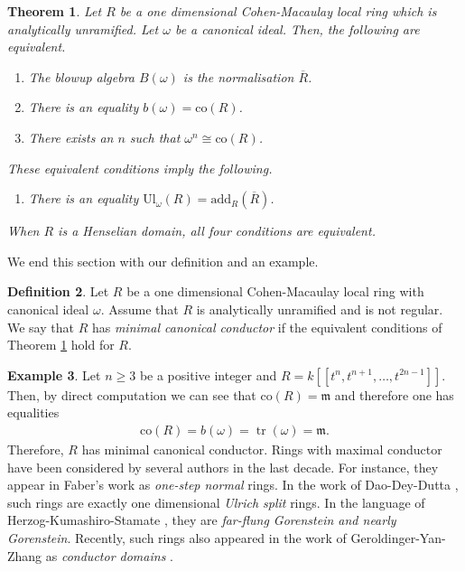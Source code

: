 \documentclass[12pt]{amsart}
\newcommand\co{\mathrm{co}}
\newcommand{\m}{\mathfrak{m}}
\newcommand{\add}{\mathrm{add}}
\newtheorem{theorem}{Theorem}[section]
\theoremstyle{definition}
\newtheorem{definition}[theorem]{Definition}
\newtheorem{example}[theorem]{Example}
\DeclareMathOperator{\tr}{\mathrm{tr}}
\begin{document}
\begin{theorem}\label{main-theorem}
     Let $R$ be a one dimensional Cohen-Macaulay local ring which is analytically unramified. Let $\omega$ be a canonical ideal. Then, the following are equivalent.
    \begin{enumerate}
        \item The blowup algebra $B(\omega)$ is the normalisation $\overline{R}$.
        \item There is an equality $b(\omega) = \co(R)$.
        \item There exists an $n$ such that $\omega^n \cong \co(R)$.
    \end{enumerate}
    These equivalent conditions imply the following.
    \begin{enumerate}
        \item[(4)] There is an equality $\mathrm{Ul}_{\omega}(R) = \add_R(\overline{R})$. 
    \end{enumerate}
    When $R$ is a Henselian domain, all four conditions are equivalent.
\end{theorem}
We end this section with our definition and an example.
\begin{definition}
    Let $R$ be a one dimensional Cohen-Macaulay local ring with canonical ideal $\omega$. Assume that $R$ is analytically unramified and is not regular. We say that $R$ has \textit{minimal canonical conductor} if the equivalent conditions of Theorem \ref{main-theorem} hold for $R$. 
\end{definition}
\begin{example}\label{one-step-normal-example}
    Let $n \geq 3$ be a positive integer and $R = k[[t^n, t^{n+1}, \ldots, t^{2n-1}]]$. Then, by direct computation we can see that $\co(R)=\m$ and therefore one has equalities 
    \begin{align*}
        \co(R) = b(\omega) = \tr(\omega) = \m.
    \end{align*}
    Therefore, $R$ has minimal canonical conductor. Rings with maximal conductor have been considered by several authors in the last decade. For instance, they appear in Faber's work \cite{Faber} as \textit{one-step normal} rings. In the work of Dao-Dey-Dutta \cite{Dao-Dey-Dutta}, such rings are exactly one dimensional \textit{Ulrich split} rings. In the language of Herzog-Kumashiro-Stamate \cite{Herzog-Kumashiro-Stamate}, they are \textit{far-flung Gorenstein and nearly Gorenstein}. Recently, such rings also appeared in the work of Geroldinger-Yan-Zhang as \textit{conductor domains} \cite{Geroldinger-Yan-Zhong}.
\end{example}
\end{document}
